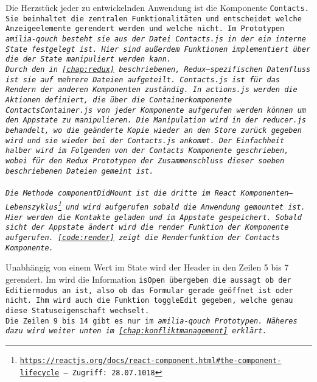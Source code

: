 Die Herzstück jeder zu entwickelnden Anwendung ist die Komponente \tt{Contacts}.
Sie beinhaltet die zentralen Funktionalitäten und entscheidet welche Anzeigeelemente gerendert werden und welche nicht.
Im Prototypen \it{amilia-qouch} besteht sie aus der Datei \tt{Contacts.js} in der ein interne State festgelegt ist.
Hier sind außerdem Funktionen implementiert über die der State manipuliert werden kann.\\
%
Durch den in \autoref{chap:redux} beschriebenen, Redux--spezifischen Datenfluss ist sie auf mehrere Dateien aufgeteilt.
\tt{Contacts.js} ist für das Rendern der anderen Komponenten zuständig. 
In \tt{actions.js} werden die Aktionen definiert, die über die Containerkomponente \tt{ContactsContainer.js} von jeder Komponente aufgerufen werden können um den \gls{App}state zu manipulieren.
Die Manipulation wird in der \tt{reducer.js} behandelt, wo die geänderte Kopie wieder an den Store zurück gegeben wird und sie wieder bei der \tt{Contacts.js} ankommt.
Der Einfachheit halber wird im Folgenden von der \tt{Contacts} Komponente geschrieben, wobei für den Redux Prototypen der Zusammenschluss dieser soeben beschriebenen Dateien gemeint ist.\\\\
%
% 
Die Methode \tt{componentDidMount} ist die dritte im React Komponenten--Lebenszyklus\footnote{ \url{https://reactjs.org/docs/react-component.html\#the-component-lifecycle} -- Zugriff: 28.07.1018} und wird aufgerufen sobald die Anwendung gemountet ist.
Hier werden die Kontakte geladen und im \gls{App}state gespeichert.
Sobald sicht der \gls{App}state ändert wird die \tt{render} Funktion der Komponente aufgerufen. \autoref{code:render} zeigt die Renderfunktion der \tt{Contacts} Komponente.
%
\begin{center}
  
\end{center}
%
Unabhängig von einem Wert im State wird der Header in den Zeilen 5 bis 7 gerendert.
Im wird die Information \tt{isOpen} übergeben die aussagt ob der Editiermodus an ist, also ob das Formular gerade geöffnet ist oder nicht.
Ihm wird auch die Funktion \tt{toggleEdit} gegeben, welche genau diese Statuseigenschaft wechselt.\\
Die Zeilen 9 bis 14 gibt es nur im \it{amilia-qouch} Prototypen. Näheres dazu wird weiter unten im \autoref{chap:konfliktmanagement} erklärt.\\
